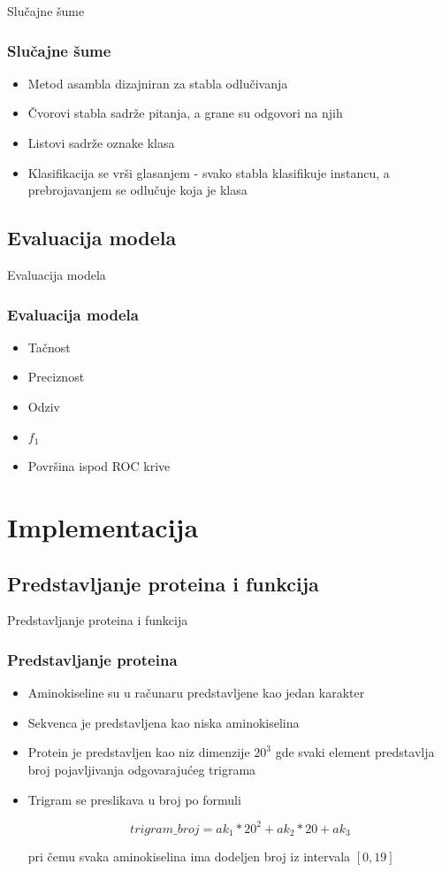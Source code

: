 \documentclass{beamer}
\begin{document}
 
 
\begin{frame}{Slučajne šume}
	\frametitle{Slučajne šume}
	
	\begin{itemize}
		\item Metod asambla dizajniran za stabla odlučivanja
		\item Čvorovi stabla sadrže pitanja, a grane su odgovori na njih
		\item Listovi sadrže oznake klasa
		\item Klasifikacija se vrši glasanjem - svako stabla klasifikuje instancu, a prebrojavanjem se odlučuje koja je klasa
	\end{itemize}
\end{frame}



\subsection{Evaluacija modela}
\begin{frame}{Evaluacija modela}
	\frametitle{Evaluacija modela}
	\begin{itemize}
		\item Tačnost
		
		\item Preciznost
		
		\item Odziv
		
		\item $f_1$
		
		\item Površina ispod ROC krive
		
	\end{itemize}
\end{frame}
		
		
\section{Implementacija}
\subsection{Predstavljanje proteina i funkcija}
\begin{frame}{Predstavljanje proteina i funkcija}
	\frametitle{Predstavljanje proteina}
	\begin{itemize}
		\item Aminokiseline su u računaru predstavljene kao jedan karakter 
		\item Sekvenca je predstavljena kao niska aminokiselina
		\item Protein je predstavljen kao niz dimenzije $20^3$ gde svaki element predstavlja broj pojavljivanja odgovarajućeg trigrama
		\item Trigram se preslikava u broj po formuli 
		
		$$trigram\_broj = ak_1 * 20^2 + ak_2 * 20 + ak_3$$
		
		pri čemu svaka aminokiselina ima dodeljen broj iz intervala $[0, 19]$
	\end{itemize}
\end{frame}
\end{document}
